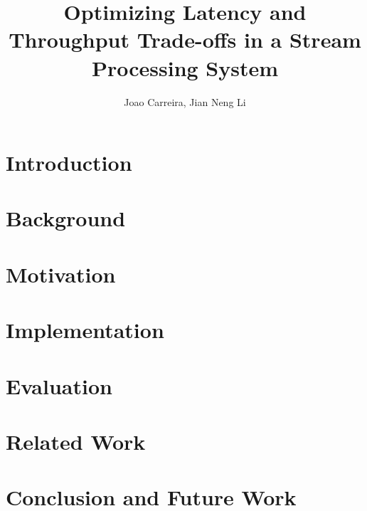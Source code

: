 \documentclass[10pt,twocolumn]{article}
\begin{document}
\title{{\bf Optimizing Latency and Throughput Trade-offs in a Stream Processing System}}
\author[1]{{Joao Carreira, Jian Neng Li}}
\date{}
\maketitle

\begin{abstract}
\noindent

\end{abstract}

\section{Introduction}


\section{Background}


\section{Motivation}


\section{Implementation}


\section{Evaluation}


\section{Related Work}


\section{Conclusion and Future Work}




\end{document}
